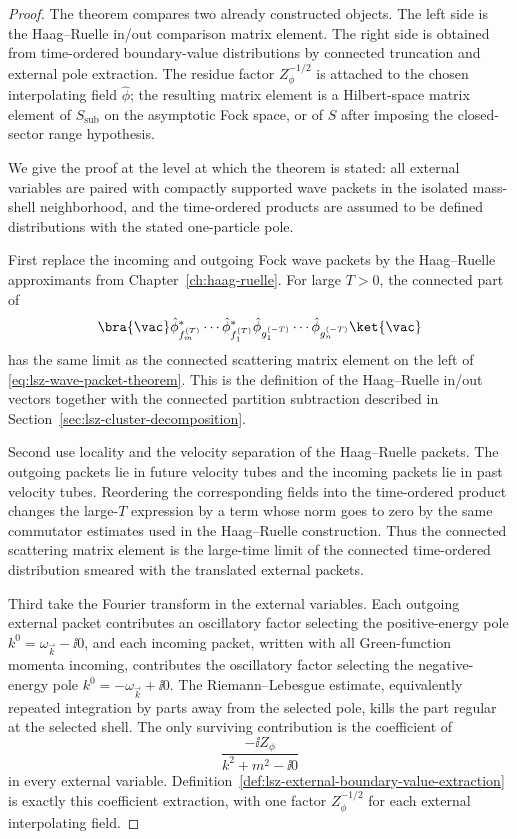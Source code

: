 \begin{proof}
The theorem compares two already constructed objects.  The left side is the
Haag--Ruelle in/out comparison matrix element.  The right side is obtained from
time-ordered boundary-value distributions by connected truncation and
external pole extraction.  The residue factor \(Z_\phi^{-1/2}\) is attached to
the chosen interpolating field \(\widehat\phi\); the resulting matrix element
is a Hilbert-space matrix element of \(S_{\mathrm{sub}}\) on the asymptotic Fock
space, or of \(S\) after imposing the closed-sector range hypothesis.

We give the proof at the level at which the theorem is stated: all external
variables are paired with compactly supported wave packets in the isolated
mass-shell neighborhood, and the time-ordered products are assumed to be
defined distributions with the stated one-particle pole.

First replace the incoming and outgoing Fock wave packets by the
Haag--Ruelle approximants from Chapter~\ref{ch:haag-ruelle}.  For large
\(T>0\), the connected part of
\[
  \bra{\vac}
  \hat\phi_{f_m^{(T)}}^*\cdots\hat\phi_{f_1^{(T)}}^*
  \hat\phi_{g_1^{(-T)}}\cdots\hat\phi_{g_n^{(-T)}}\ket{\vac}
\]
has the same limit as the connected scattering matrix element on the left of
\eqref{eq:lsz-wave-packet-theorem}.  This is the definition of the
Haag--Ruelle in/out vectors together with the connected partition subtraction
described in Section~\ref{sec:lsz-cluster-decomposition}.

Second use locality and the velocity separation of the Haag--Ruelle packets.
The outgoing packets lie in future velocity tubes and the incoming packets lie
in past velocity tubes.  Reordering the corresponding fields into the
time-ordered product changes the large-\(T\) expression by a term whose norm
goes to zero by the same commutator estimates used in the Haag--Ruelle
construction.  Thus the connected scattering matrix element is the large-time
limit of the connected time-ordered distribution smeared with the translated
external packets.

Third take the Fourier transform in the external variables.  Each outgoing
external packet contributes an oscillatory factor selecting the positive-energy
pole \(k^0=\omega_{\vec k}-\ii0\), and each incoming packet, written with all
Green-function momenta incoming, contributes the oscillatory factor selecting
the negative-energy pole \(k^0=-\omega_{\vec k}+\ii0\).  The
Riemann--Lebesgue estimate, equivalently repeated integration by parts away
from the selected pole, kills the part regular at the selected shell.  The
only surviving contribution is the coefficient of
\[
  \frac{-\ii Z_\phi}{k^2+m^2-\ii0}
\]
in every external variable.
Definition~\ref{def:lsz-external-boundary-value-extraction} is exactly this
coefficient extraction, with one factor \(Z_\phi^{-1/2}\) for each external
interpolating field.


\end{proof}
